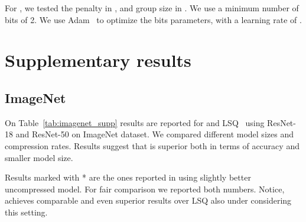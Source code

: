 For \diffq, we tested the penalty  in , and group size  in . We use a minimum number of bits of 2. We use Adam~\citep{adam} to optimize the bits parameters, with a learning rate of .

\section{Supplementary results}
\label{app:results}

\subsection{ImageNet}
\label{supp:imagenet}
On Table~\ref{tab:imagenet_supp} results are reported for \diffq and LSQ~\cite{esser2020learned} using ResNet-18 and ResNet-50 on ImageNet dataset. We compared different model sizes and compression rates. Results suggest that \diffq is superior both in terms of accuracy and smaller model size. 

Results marked with * are the ones reported in \cite{esser2020learned} using slightly better uncompressed model. For fair comparison we reported both numbers. Notice, \diffq achieves comparable and even superior results over LSQ also under considering this setting.


